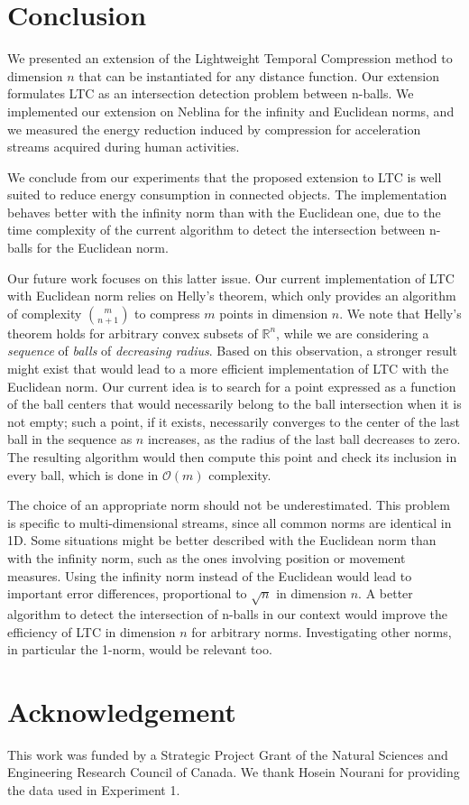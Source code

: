 \documentclass[10pt, conference, compsocconf]{IEEEtran}
\begin{document}


\section{Conclusion}

We presented an extension of the Lightweight Temporal Compression 
method to dimension $n$ that can be instantiated for any distance 
function. Our extension formulates LTC as an intersection detection 
problem between n-balls. We implemented our extension on Neblina for the 
infinity and Euclidean norms, and we measured the energy reduction 
induced by compression for acceleration streams acquired during
 human activities.

We conclude from our experiments that the proposed extension to LTC is 
well suited to reduce energy consumption in connected objects. The implementation 
behaves better with the infinity norm than with the Euclidean one, due 
to the time complexity of the current algorithm to detect the intersection 
between n-balls for the Euclidean norm.

Our future work focuses on this latter issue. Our current 
implementation of LTC with Euclidean norm relies on Helly's theorem, 
which only provides an algorithm of complexity ${m \choose n+1}$ to 
compress $m$ points in 
dimension $n$. We note that Helly's theorem holds for arbitrary convex 
subsets of $\mathbb{R}^n$, while we are considering a \emph{sequence} 
of \emph{balls} of \emph{decreasing radius}. Based on this 
observation, a stronger result might exist that would lead to a more 
efficient implementation of LTC with the Euclidean norm. Our current 
idea is to search for a point expressed as a function of the ball centers that would 
necessarily belong to the ball intersection when it is not empty; such 
a point, if it exists, necessarily converges to the center of the last 
ball in the sequence as $n$ increases, as the radius of the last ball 
decreases to zero. The resulting algorithm would then compute this 
point and check its inclusion in every ball, which is done in 
$\mathcal{O}(m)$ complexity.

The choice of an appropriate norm should not be underestimated. This problem 
is specific to multi-dimensional streams, since all common norms are 
identical in 1D. Some situations might be better described with the 
Euclidean norm than with the infinity norm, such as the ones involving 
position or movement measures. Using the infinity norm instead of the 
Euclidean would lead to important error differences, proportional to 
$\sqrt{n}$ in dimension $n$. A better algorithm to detect the 
intersection of n-balls in our context would improve the efficiency of 
LTC in dimension $n$ for arbitrary norms. Investigating other norms, in 
particular the 1-norm, would be relevant too.

\section*{Acknowledgement}
This work was funded by a Strategic Project Grant of the Natural 
Sciences and Engineering Research Council of Canada. We thank Hosein 
Nourani for providing the data used in Experiment 1.



\end{document}
